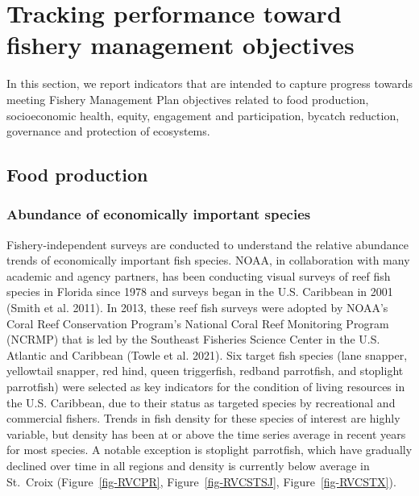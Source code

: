 \documentclass[
  letterpaper,
  oneside,
  open=any]{scrbook}
\begin{document}

\chapter{Tracking performance toward fishery management
objectives}\label{tracking-performance-toward-fishery-management-objectives}

In this section, we report indicators that are intended to capture
progress towards meeting Fishery Management Plan objectives related to
food production, socioeconomic health, equity, engagement and
participation, bycatch reduction, governance and protection of
ecosystems.

\section{Food production}\label{food-production}

\subsection{Abundance of economically important
species}\label{abundance-of-economically-important-species}

Fishery-independent surveys are conducted to understand the relative
abundance trends of economically important fish species. NOAA, in
collaboration with many academic and agency partners, has been
conducting visual surveys of reef fish species in Florida since 1978 and
surveys began in the U.S. Caribbean in 2001 (Smith et al. 2011). In
2013, these reef fish surveys were adopted by NOAA's Coral Reef
Conservation Program's National Coral Reef Monitoring Program (NCRMP)
that is led by the Southeast Fisheries Science Center in the U.S.
Atlantic and Caribbean (Towle et al. 2021). Six target fish species
(lane snapper, yellowtail snapper, red hind, queen triggerfish, redband
parrotfish, and stoplight parrotfish) were selected as key indicators
for the condition of living resources in the U.S. Caribbean, due to
their status as targeted species by recreational and commercial fishers.
Trends in fish density for these species of interest are highly
variable, but density has been at or above the time series average in
recent years for most species. A notable exception is stoplight
parrotfish, which have gradually declined over time in all regions and
density is currently below average in St.~Croix (Figure~\ref{fig-RVCPR},
Figure~\ref{fig-RVCSTSJ}, Figure~\ref{fig-RVCSTX}).
\end{document}
